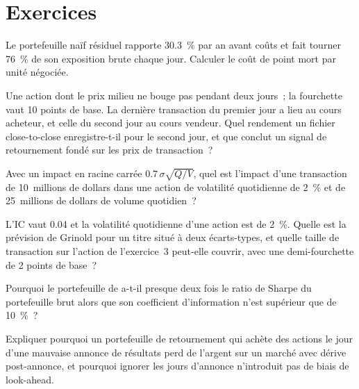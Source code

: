 \section{Exercices}

\begin{exercise}[$\star$]\label{exo:s1:short-term-reversal:1}
Le portefeuille naïf résiduel rapporte 30.3~\% par an avant coûts et fait tourner 76~\% de son exposition brute chaque jour. Calculer le coût de point mort par unité négociée.
\end{exercise}

\begin{exercise}[$\star$]\label{exo:s1:short-term-reversal:2}
Une action dont le prix milieu ne bouge pas pendant deux jours~; la fourchette vaut 10 points de base. La dernière transaction du premier jour a lieu au cours acheteur, et celle du second jour au cours vendeur. Quel rendement
un fichier close-to-close enregistre-t-il pour le second jour, et que conclut un signal de retournement fondé sur les prix de transaction~?
\end{exercise}

\begin{exercise}[$\star$]\label{exo:s1:short-term-reversal:3}
Avec un impact en racine carrée $0.7\,\sigma\sqrt{Q/V}$, quel est l'impact d'une transaction de 10~millions de dollars dans une action de volatilité quotidienne de 2~\% et de 25~millions de dollars de volume quotidien~?
\end{exercise}

\begin{exercise}[$\star\star$]\label{exo:s1:short-term-reversal:4}
L'IC vaut 0.04 et la volatilité quotidienne d'une action est de 2~\%. Quelle est la prévision de Grinold pour un titre situé à deux écarts-types, et quelle taille de transaction sur l'action
de l'exercice~3 peut-elle couvrir, avec une demi-fourchette de 2 points de base~?
\end{exercise}

\begin{exercise}[$\star\star$]\label{exo:s1:short-term-reversal:5}
Pourquoi le portefeuille de  a-t-il presque deux fois le ratio de Sharpe du portefeuille brut alors que son coefficient d'information n'est supérieur que de 10~\%~?
\end{exercise}

\begin{exercise}[$\star\star$]\label{exo:s1:short-term-reversal:6}
Expliquer pourquoi un portefeuille de retournement qui achète des actions le jour d'une mauvaise annonce de résultats perd de l'argent sur un marché avec dérive post-annonce, et pourquoi ignorer
les jours d'annonce n'introduit pas de biais de look-ahead.
\end{exercise}

